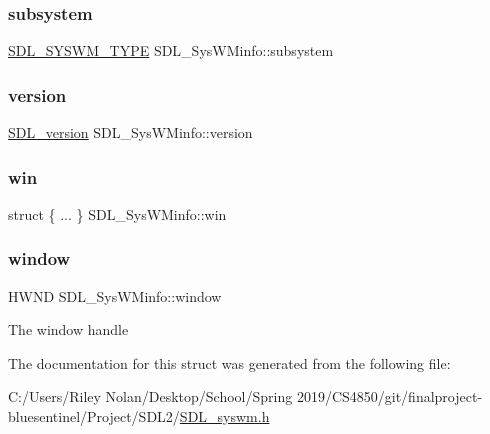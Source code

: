 \mbox{\label{struct_s_d_l___sys_w_minfo_a438b6a06ab3ee417293c7b7fc5a23855}} 
\subsubsection{\texorpdfstring{subsystem}{subsystem}}
{\footnotesize\ttfamily \mbox{\hyperlink{_s_d_l__syswm_8h_a064c26598287280fff2a00d6758ac4f7}{S\+D\+L\+\_\+\+S\+Y\+S\+W\+M\+\_\+\+T\+Y\+PE}} S\+D\+L\+\_\+\+Sys\+W\+Minfo\+::subsystem}

\mbox{\label{struct_s_d_l___sys_w_minfo_ac3a70af022d4849e9ff546595e94627f}} 
\subsubsection{\texorpdfstring{version}{version}}
{\footnotesize\ttfamily \mbox{\hyperlink{struct_s_d_l__version}{S\+D\+L\+\_\+version}} S\+D\+L\+\_\+\+Sys\+W\+Minfo\+::version}

\mbox{\label{struct_s_d_l___sys_w_minfo_a5c91213a681bcd654359078862e269de}} 
\subsubsection{\texorpdfstring{win}{win}}
{\footnotesize\ttfamily struct \{ ... \}   S\+D\+L\+\_\+\+Sys\+W\+Minfo\+::win}

\mbox{\label{struct_s_d_l___sys_w_minfo_af06225591ff07e837bbd037728a525b9}} 
\subsubsection{\texorpdfstring{window}{window}}
{\footnotesize\ttfamily H\+W\+ND S\+D\+L\+\_\+\+Sys\+W\+Minfo\+::window}

The window handle 

The documentation for this struct was generated from the following file\+:\begin{DoxyCompactItemize}
\item 
C\+:/\+Users/\+Riley Nolan/\+Desktop/\+School/\+Spring 2019/\+C\+S4850/git/finalproject-\/bluesentinel/\+Project/\+S\+D\+L2/\mbox{\hyperlink{_s_d_l__syswm_8h}{S\+D\+L\+\_\+syswm.\+h}}\end{DoxyCompactItemize}
